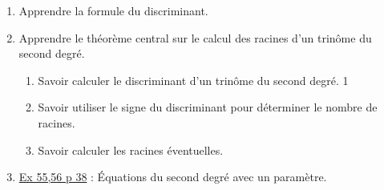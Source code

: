 \documentclass[a4paper,11pt]{article}
\theoremstyle{break}
\begin{document}
  \begin{Dev}
    
    \begin{enumerate}
      
      \item Apprendre la formule du discriminant.
      \item Apprendre le théorème central sur le calcul des racines 
	d'un trinôme du second degré.
      \begin{enumerate}
	\item Savoir calculer le discriminant d'un trinôme du second degré. 1
	\item Savoir utiliser le signe du discriminant pour déterminer
	le nombre de racines.
	\item Savoir calculer les racines éventuelles.
      \end{enumerate}
      \item
      \href{https://github.com/mathlorgues/math1sd1516/blob/master/images/55-56p38.png}
   {Ex 55,56 p 38} : \'Equations du second degré avec un paramètre.
      
    \end{enumerate}
  \end{Dev}


  
\end{document}
